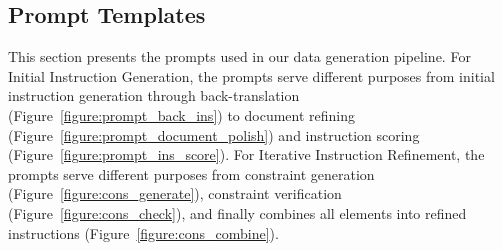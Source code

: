 \begin{table}[!ht]
\centering
\renewcommand{\arraystretch}{1.1}
\caption{Hyper-parameters for RL experiments.}
\label{tab:hyperparams_rl}
\end{table}

\subsection{Prompt Templates}
\label{appendix:prompt_templates}

This section presents the prompts used in our data generation pipeline. For Initial Instruction Generation, the prompts serve different purposes from initial instruction generation through back-translation (Figure~\ref{figure:prompt_back_ins}) to document refining (Figure~\ref{figure:prompt_document_polish}) and instruction scoring (Figure~\ref{figure:prompt_ins_score}). For Iterative Instruction Refinement, the prompts serve different purposes from constraint generation (Figure~\ref{figure:cons_generate}), constraint verification (Figure~\ref{figure:cons_check}), and finally combines all elements into refined instructions (Figure~\ref{figure:cons_combine}).

